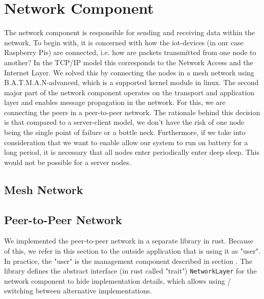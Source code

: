 
\section{Network Component}

The network component is responsible for sending and receiving data within the network. 
To begin with, it is concerned with how the iot-devices (in our case Raspberry Pis) are connected, i.e. how are packets transmitted from one node to another?
In the TCP/IP model this corresponds to the Network Access and the Internet Layer.
We solved this by connecting the nodes in a mesh network using B.A.T.M.A.N-advanced, which is a supported kernel module in linux. 
The second major part of the network component operates on the transport and application layer and enables message propagation in the network. 
For this, we are connecting the peers in a peer-to-peer network.
The rationale behind this decision is that compared to a server-client model, we don't have the risk of one node being the single point of failure or a bottle neck. 
Furthermore, if we take into consideration that we want to enable allow our system to run on battery for a long period, it is necessary that all nodes enter periodically enter deep sleep. 
This would not be possible for a server nodes.

\subsection{Mesh Network}


\subsection{Peer-to-Peer Network}

We implemented the peer-to-peer network in a separate library in rust.
Because of this, we refer in this section to the outside application that is using it as "user". 
In practice, the "user" is the management component described in section \label{sec:mangement}.
The library defines the abstract interface (in rust called "trait") \verb|NetworkLayer| for the network component to hide implementation details, which allows using / switching between alternative implementations.



